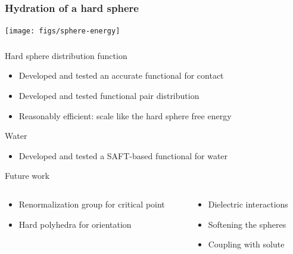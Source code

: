 
\begin{frame}
  \frametitle{Hydration of a hard sphere}
  \begin{center}
    \vspace{-1em}
    \texttt{[image: figs/sphere-energy]}
  \end{center}
  \vspace{-1.5em}
\end{frame}

\begin{frame}
  \frametitle{\conclude}
  \vspace{2em}
  \begin{block}{Hard sphere distribution function}
    \begin{itemize}
    \item Developed and tested an accurate functional for contact
    \item Developed and tested functional pair distribution
    \item Reasonably efficient: scale like the hard sphere free
      energy
    \end{itemize}
  \end{block}
  \begin{block}{Water}
    \begin{itemize}
    \item Developed and tested a SAFT-based functional for water
    \end{itemize}
  \end{block}
  \begin{block}{Future work}
    \begin{columns}
      \begin{column}{0.6\columnwidth}
        \begin{itemize}
        \item Renormalization group for critical point
        \item Hard polyhedra for orientation
        \end{itemize}
      \end{column}
      \begin{column}{0.5\columnwidth}
        \begin{itemize}
        \item Dielectric interactions
        \item Softening the spheres
        \item Coupling with solute
        \end{itemize}
      \end{column}
    \end{columns}
  \end{block}
\end{frame}
